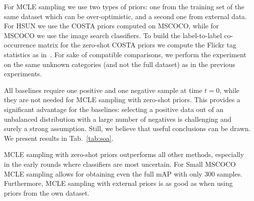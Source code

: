 \documentclass[10pt,twocolumn,letterpaper]{article}
\newcommand{\cgm}[1]{\textcolor{purple}{\textbf{CS}: #1}}
\begin{document}
For MCLE sampling we use two types of priors: one from the training set of the same dataset which can be over-optimistic, and a second one from external data.
For HSUN we use the COSTA priors computed on MSCOCO, while for MSCOCO we use the image search classifiers. 
%
To build the label-to-label co-occurrence matrix for the zero-shot COSTA priors we 
compute the Flickr tag statistics as in~\cite{MensinkCVPR2014}. For sake of compatible comparisons, we perform the experiment on the same unknown categories (and not the full dataset) as in the previous experiments. 


All baselines require one positive and one negative sample 
at time $t = 0$, while they are not needed for MCLE
sampling with zero-shot priors. This provides a significant
advantage for the baselines: selecting a positive data out of
an unbalanced distribution with a large number of negatives
is challenging and surely a strong assumption. Still, we believe that useful conclusions can
be drawn. We present results in Tab.~\ref{tab:soa}.


MCLE sampling with zero-shot priors outperforms all other methods, especially in the early rounds where classifiers are most uncertain.
For Small MSCOCO MCLE sampling allows for obtaining even the full mAP with only 300 samples.
Furthermore, MCLE sampling with external priors is as good as when using priors from the own dataset.
\end{document}
